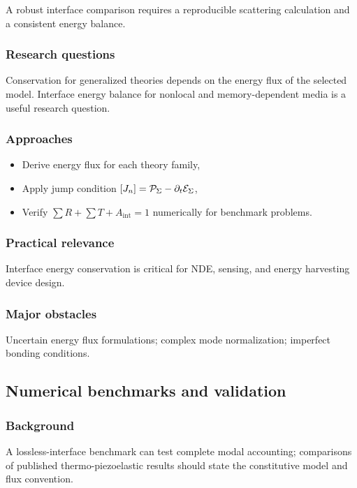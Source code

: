 A robust interface comparison requires a reproducible scattering calculation and a consistent energy balance.

\subsubsection{Research questions}

Conservation for generalized theories depends on the energy flux of the selected model. Interface energy balance for nonlocal and memory-dependent media is a useful research question.

\subsubsection{Approaches}

\begin{itemize}
\item Derive energy flux for each theory family,
\item Apply jump condition $\left[ J_n \right] = \mathcal{P}_\Sigma - \partial_t\mathcal{E}_\Sigma$,
\item Verify $\sum R + \sum T + A_{\mathrm{int}} = 1$ numerically for benchmark problems.
\end{itemize}

\subsubsection{Practical relevance}

Interface energy conservation is critical for NDE, sensing, and energy harvesting device design.

\subsubsection{Major obstacles}

Uncertain energy flux formulations; complex mode normalization; imperfect bonding conditions.

\subsection{Numerical benchmarks and validation}
\label{sec:15.3}

\subsubsection{Background}

A lossless-interface benchmark can test complete modal accounting; comparisons of published thermo-piezoelastic results should state the constitutive model and flux convention.

